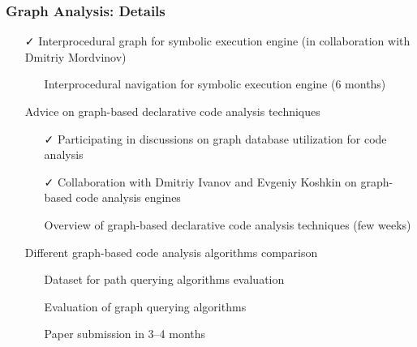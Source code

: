 \documentclass[xcolor=table,aspectratio=169]{beamer}
\begin{document}
\begin{frame}[fragile]
  \frametitle{Graph Analysis: Details} 
  \begin{itemize}
    \item[\faCheck] Interprocedural graph for symbolic execution engine (in collaboration with Dmitriy Mordvinov)
    \begin{itemize}
      \item[\faHourglassHalf] Interprocedural navigation for symbolic execution engine (6 months)
    \end{itemize}
    \pause
    \item[\faGears] Advice on graph-based declarative code analysis techniques
    \begin{itemize}
      \item[\faCheck] Participating in discussions on graph database utilization for code analysis
      \item[\faCheck] Collaboration with Dmitriy Ivanov and Evgeniy Koshkin on graph-based code analysis engines
      \item[\faGears] Overview of graph-based declarative code analysis techniques (few weeks)
    \end{itemize}
    \pause
    \item[\faGears] Different graph-based code analysis algorithms comparison
    \begin{itemize}
      \item[\faGears] Dataset for path querying algorithms evaluation
      \item[\faGears] Evaluation of graph querying algorithms
      \item[\faGears] Paper submission in 3--4 months 
    \end{itemize} 
    \end{itemize}
\end{frame}
\end{document}
